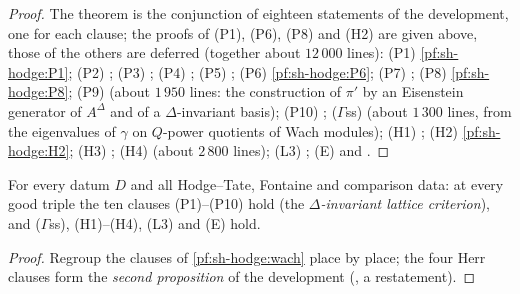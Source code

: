 \begin{proof}
The theorem is the conjunction of eighteen statements of the development, one for each clause; the proofs of (P1), (P6), (P8) and (H2) are given above, those of
the others are deferred (together about $12\,000$ lines): (P1) \cref{pf:sh-hodge:P1}; (P2)
; (P3)
; (P4) ;
(P5) ; (P6) \cref{pf:sh-hodge:P6}; (P7)
;
(P8) \cref{pf:sh-hodge:P8}; (P9)  (about $1\,950$ lines: the
construction of $\pi'$ by an Eisenstein generator of $A^\Delta$ and of a $\Delta$-invariant basis); (P10)
; ($\Gamma$ss) 
(about $1\,300$ lines, from the eigenvalues of $\gamma$ on $Q$-power quotients of Wach modules); (H1) ;
(H2) \cref{pf:sh-hodge:H2}; (H3) ;
(H4)  (about $2\,800$ lines); (L3)
; (E)  and
.
\end{proof}

\begin{corollary}\label{pf:sh-hodge:used}
For every datum $D$ and all Hodge--Tate, Fontaine and comparison data: at every good triple the ten clauses (P1)--(P10) hold (the
\emph{$\Delta$-invariant lattice criterion}), and ($\Gamma$ss), (H1)--(H4), (L3) and (E) hold.
\end{corollary}

\begin{proof}
Regroup the clauses of \cref{pf:sh-hodge:wach} place by place; the four Herr clauses form the \emph{second proposition} of the development
(, a restatement).
\end{proof}

